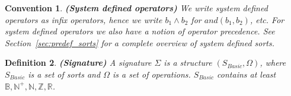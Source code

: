 \documentclass[a4paper,11pt]{article}
\newcommand{\comment}[1]{\begin{quotation} {\sf *** #1 ***} \end{quotation}}
\newcommand{\Bools}{{\mathbb B}}   %
\newcommand{\Reals}{{\mathbb R}}   %
\newcommand{\Nats}{{\mathbb N}}    %
\newcommand{\Natspos}{{\mathbb N^+}} %
\newcommand{\Ints}{{\mathbb Z}}    %
\newcommand{\basicsort}{{S_{\mathit{Basic}}}}
\newtheorem{thdefinition}{Definition}[section]
\newenvironment{definition}
  {\begin{thdefinition}\em}
  {\end{thdefinition}}
\newtheorem{thconvention}[thdefinition]{Convention}
\newenvironment{convention}
  {\begin{thconvention}\em}
  {\end{thconvention}}
\begin{document}
% 
\begin{convention}\textbf{(System defined operators)}
We write system defined operators as infix operators, hence we write $b_1 \land b_2$ for $and(b_1,b_2)$, etc. For system defined operators we also have a notion of operator precedence. See Section~\ref{sec:predef_sorts} for a complete overview of system defined sorts.
\end{convention}
% 
% 
% 
% 
% 

\begin{definition}\textbf{(Signature)}
A signature $\Sigma$ is a structure $(\basicsort, \Omega)$, where $\basicsort$ is a set of sorts and $\Omega$ is a set of operations. $\basicsort$ contains at least $\Bools, \Natspos, \Nats, \Ints, \Reals$.
\end{definition}
\end{document}
